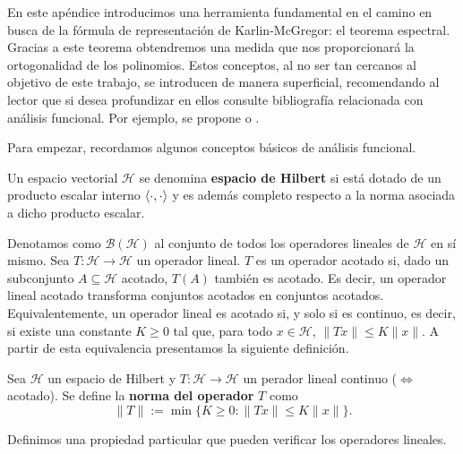 
    
    En este apéndice introducimos una herramienta fundamental en el camino en busca de la fórmula de representación de Karlin-McGregor: el teorema espectral. Gracias a este teorema obtendremos una medida que nos proporcionará la ortogonalidad de los polinomios. Estos conceptos, al no ser tan cercanos al objetivo de este trabajo, se introducen de manera superficial, recomendando al lector que si desea profundizar en ellos consulte bibliografía relacionada con análisis funcional. Por ejemplo, se propone \cite[Ch. 1]{Manuel} o \cite[Ch. 12]{rudin}.
    
    Para empezar, recordamos algunos conceptos básicos de análisis funcional.

    \begin{definicion}
        Un espacio vectorial $\mathcal{H}$ se denomina \textbf{espacio de Hilbert} si está dotado de un producto escalar interno $\left\langle \cdot , \cdot \right\rangle$ y es además completo respecto a la norma asociada a dicho producto escalar.
    \end{definicion}

    Denotamos como $\mathcal{B}(\mathcal{H})$ al conjunto de todos los operadores lineales de $\mathcal{H}$ en sí mismo. Sea $T:\mathcal H \longrightarrow \mathcal{H}$ un operador lineal. $T$ es un operador acotado si, dado un subconjunto $A\subseteq \mathcal{H}$ acotado, $T(A)$ también es acotado. Es decir, un operador lineal acotado transforma conjuntos acotados en conjuntos acotados. Equivalentemente, un operador lineal es acotado si, y solo si es continuo, es decir, si existe una constante $K\geq 0$ tal que, para todo $x\in\mathcal H$, $\|Tx\|\leq K\|x\|$. A partir de esta equivalencia presentamos la siguiente definición.

    \begin{definicion}
        Sea $\mathcal{H}$ un espacio de Hilbert y $T:\mathcal H \longrightarrow \mathcal{H}$ un perador lineal continuo ($\Leftrightarrow$ acotado). Se define la \textbf{norma del operador} $T$ como
        \begin{equation}
            \label{eq:norma-operadores}
            \|T\|:= \min\{K\geq 0: \|Tx\|\leq K\|x\|\}.
        \end{equation}
    \end{definicion}

    Definimos una propiedad particular que pueden verificar los operadores lineales.

